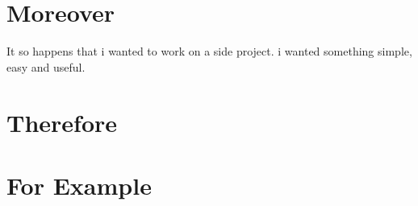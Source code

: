 \documentclass{article}
\begin{document}
\section{Moreover}

It so happens that i wanted to work on a side project. \Moreover i wanted something simple, easy and useful.

\Moreover

\Moreover

\Moreover

\Moreover



\section{Therefore}

\Therefore 

\Therefore

\Therefore

\Therefore

\Therefore

\section{For Example}

\Forexample 

\Forexample

\Forexample

\Forexample

\Forexample
\end{document}
